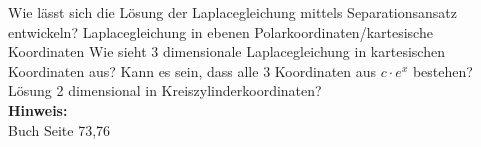 \begin{question}[section=3,subsection=32,name={Laplacelösung mittels Seperationsansatz},difficulty=8,type=mdl,tags={}]
	Wie lässt sich die Lösung der Laplacegleichung mittels Separationsansatz entwickeln? Laplacegleichung in ebenen Polarkoordinaten/kartesische Koordinaten Wie sieht 3 dimensionale Laplacegleichung in kartesischen Koordinaten aus? Kann es sein, dass alle 3 Koordinaten aus $c \cdot e^{x} $ bestehen?
	Lösung 2 dimensional in Kreiszylinderkoordinaten?
	\\ \textbf{Hinweis:}\\
	Buch Seite 73,76
\end{question}
\begin{solution}
	
\end{solution}